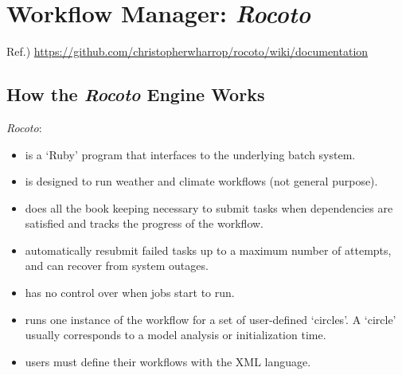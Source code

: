 \documentclass[11pt,fleqn]{report}              %
\begin{document}

\appendix





\chapter{Workflow Manager: {\it Rocoto}}        

Ref.) \url{https://github.com/christopherwharrop/rocoto/wiki/documentation}

\section{How the {\it Rocoto} Engine Works}
\label{sec:rocoto}

{\it Rocoto}:
\begin{itemize}
\item is a `Ruby' program that interfaces to the underlying batch system.
\item is designed to run weather and climate workflows (not general purpose).
\item does all the book keeping necessary to submit tasks when dependencies are satisfied and tracks the progress of the workflow.
\item automatically resubmit failed tasks up to a maximum number of attempts, and can recover from system outages.
\item has no control over when jobs start to run.
\item runs one instance of the workflow for a set of user-defined `circles'. A `circle' usually corresponds to a model analysis or initialization time.
\item users must define their workflows with the XML language.
\end{itemize}
\end{document}
